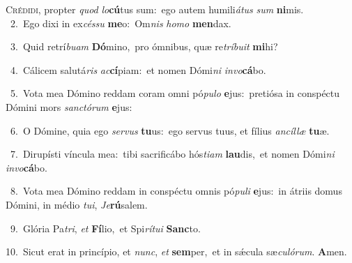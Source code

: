 \lettrine{\initial\textcolor{\initialcolor}{C}}{rédidi,} propter \textit{quod} \textit{lo}\-\textbf{cú}tus sum:~\star ego autem humili\-\textit{á}\-\textit{tus} \textit{sum} \textbf{ni}\-mis.\\
{\numbfont\textcolor{\numbcolor}{~2.}}~Ego dixi in ex\-\textit{cés}\-\textit{su} \textbf{me}\-o:~\star Om\textit{nis} \textit{ho}\-\textit{mo} \textbf{men}\-dax.\par
{\numbfont\textcolor{\numbcolor}{~3.}}~Quid retrí\-\textit{bu}\-\textit{am} \textbf{Dó}\-mino,~\star pro ómnibus, quæ re\-\textit{trí}\-\textit{bu}\textit{it} \textbf{mi}\-hi?\par
{\numbfont\textcolor{\numbcolor}{~4.}}~Cálicem salutá\textit{ris} \textit{ac}\-\textbf{cí}piam:~\star et nomen Dómi\textit{ni} \textit{in}\-\textit{vo}\textbf{cá}bo.\par
{\numbfont\textcolor{\numbcolor}{~5.}}~Vota mea Dómino reddam coram omni pó\-\textit{pu}\-\textit{lo} \textbf{e}\-jus:~\star pretiósa in conspéctu Dómini mors \textit{sanc}\-\textit{tó}\textit{rum} \textbf{e}\-jus:\par
{\numbfont\textcolor{\numbcolor}{~6.}}~O Dómine, quia ego \textit{ser}\-\textit{vus} \textbf{tu}\-us:~\star ego servus tuus, et fílius \textit{an}\-\textit{cíl}\textit{læ} \textbf{tu}\-æ.\par
{\numbfont\textcolor{\numbcolor}{~7.}}~Dirupísti víncula mea:~\dagger tibi sacrificábo hós\-\textit{ti}\-\textit{am} \textbf{lau}\-dis,~\star et nomen Dómi\textit{ni} \textit{in}\-\textit{vo}\textbf{cá}bo.\par
{\numbfont\textcolor{\numbcolor}{~8.}}~Vota mea Dómino reddam in conspéctu omnis pó\-\textit{pu}\-\textit{li} \textbf{e}\-jus:~\star in átriis domus Dómini, in médio \textit{tu}\-\textit{i}, \textit{Je}\-\textbf{rú}salem.\par
{\numbfont\textcolor{\numbcolor}{~9.}}~Glória Pa\-\textit{tri}\-, \textit{et} \textbf{Fí}\-lio,~\star et Spi\-\textit{rí}\-\textit{tu}\textit{i} \textbf{Sanc}\-to.\par
{\numbfont\textcolor{\numbcolor}{10.}}~Sicut erat in princípio, et \textit{nunc}\-, \textit{et} \textbf{sem}\-per,~\star et in sǽcula sæ\-\textit{cu}\-\textit{ló}\textit{rum}. \textbf{A}\-men.\par
